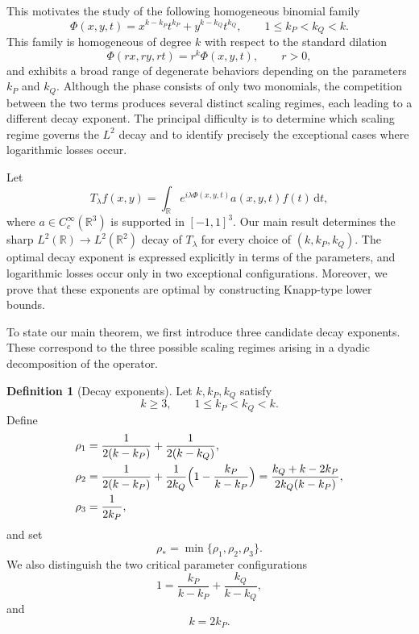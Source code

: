\documentclass[10pt]{amsart}
\numberwithin{equation}{section}
\theoremstyle{definition}
\newtheorem{definition}[theorem]{Definition}
\theoremstyle{remark}
\theoremstyle{remark}
\begin{document}
    This motivates the study of the following homogeneous binomial family
    \begin{equation}\label{eq:intro_phase}
    \Phi(x,y,t)=x^{k-k_P}t^{k_P}+y^{k-k_Q}t^{k_Q},
    \qquad
    1\le k_P<k_Q<k.
    \end{equation}
    This family is homogeneous of degree $k$ with respect to the standard dilation
    \[
    \Phi(rx,ry,rt)=r^k \Phi(x,y,t),
    \qquad r>0,
    \]
    and exhibits a broad range of degenerate behaviors depending on the parameters
    $k_P$ and $k_Q$. Although the phase consists of only two monomials, the
    competition between the two terms produces several distinct scaling regimes,
    each leading to a different decay exponent. The principal difficulty is to determine which scaling regime governs the $L^2$ decay and to identify precisely the exceptional cases where logarithmic
    losses occur.

    Let
    \begin{equation}\label{eq:intro_operator}
    T_\lambda f(x,y)=
    \int_{\mathbb R}
    e^{i\lambda \Phi(x,y,t)}
    a(x,y,t)f(t)\,\mathrm dt,
    \end{equation}
    where $a\in C_c^\infty(\mathbb R^3)$ is supported in $[-1,1]^3$.
    Our main result determines the sharp
    $L^2(\mathbb R)\rightarrow L^2(\mathbb R^2)$
    decay of $T_\lambda$ for every choice of
    $(k,k_P,k_Q)$.
    The optimal decay exponent is expressed explicitly in terms of the parameters,
    and logarithmic losses occur only in two exceptional configurations.
    Moreover, we prove that these exponents are optimal by constructing Knapp-type lower bounds.

		
	To state our main theorem, we first introduce three candidate decay exponents.
    These correspond to the three possible scaling regimes arising in a dyadic
    decomposition of the operator.
	
	\begin{definition}[Decay exponents]\label{def:rho}
		Let \(k,k_P,k_Q\) satisfy \begin{equation}\label{eq:intro_parameters}
		k\ge 3,\qquad 1\le k_P<k_Q<k.	
	\end{equation} Define
		\begin{align*}
			\rho_1
			&=
			\frac1{2(k-k_P)}+\frac1{2(k-k_Q)},\\
			\rho_2
			&=
			\frac1{2(k-k_P)}
			+
			\frac1{2k_Q}\Bigl(1-\frac{k_P}{k-k_P}\Bigr)
			=
			\frac{k_Q+k-2k_P}{2k_Q(k-k_P)},\\
			\rho_3
			&=
			\frac1{2k_P},
		\end{align*}
		and set
		\begin{equation}\label{eq:rho_star}
			\rho_*=\min\{\rho_1,\rho_2,\rho_3\}.
		\end{equation}
		We also distinguish the two critical parameter configurations
		\begin{equation}\label{eq:borderlineA}
			1=\frac{k_P}{k-k_P}+\frac{k_Q}{k-k_Q},
		\end{equation}
		and
		\begin{equation}\label{eq:borderlineB}
			k=2k_P.
		\end{equation}
	\end{definition}
    
\end{document}
